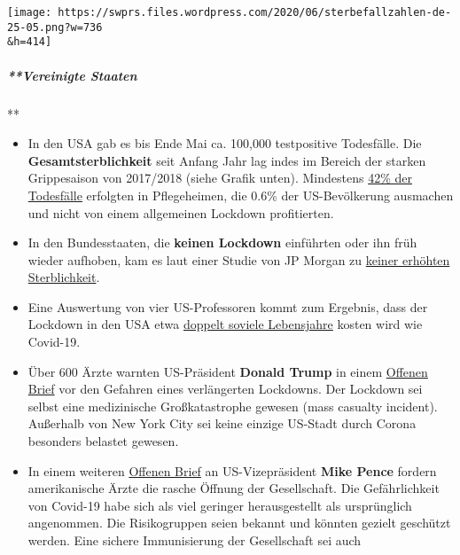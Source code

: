 \texttt{[image: https://swprs.files.wordpress.com/2020/06/sterbefallzahlen-de-25-05.png?w=736\\\&h=414]}

\hypertarget{vereinigte-staaten}{%
\subparagraph{**Vereinigte Staaten}\label{vereinigte-staaten}}

**

\begin{itemize}
\tightlist
\item
  In den USA gab es bis Ende Mai ca. 100,000 testpositive Todesfälle.
  Die \textbf{Gesamt­sterblichkeit} seit Anfang Jahr lag indes im
  Bereich der starken Grippesaison von 2017/2018 (siehe Grafik unten).
  Mindestens
  \href{https://www.forbes.com/sites/theapothecary/2020/05/26/nursing-homes-assisted-living-facilities-0-6-of-the-u-s-population-43-of-u-s-covid-19-deaths/}{42\%
  der Todesfälle} erfolgten in Pflegeheimen, die 0.6\% der
  US-Bevölkerung ausmachen und nicht von einem allgemeinen Lockdown
  profitierten.
\item
  In den Bundesstaaten, die \textbf{keinen Lockdown} einführten oder ihn
  früh wieder aufhoben, kam es laut einer Studie von JP Morgan zu
  \href{https://www.dailymail.co.uk/news/article-8347635/Lockdowns-failed-alter-course-pandemic-JP-Morgan-study-claims.html}{keiner
  erhöhten Sterblichkeit}.
\item
  Eine Auswertung von vier US-Professoren kommt zum Ergebnis, dass der
  Lockdown in den USA etwa
  \href{https://thehill.com/opinion/healthcare/499394-the-covid-19-shutdown-will-cost-americans-millions-of-years-of-life}{doppelt
  soviele Lebensjahre} kosten wird wie Covid-19.
\item
  Über 600 Ärzte warnten US-Präsident \textbf{Donald Trump} in einem
  \href{https://www.washingtonexaminer.com/news/mass-casualty-incident-over-600-doctors-sign-letter-warning-trump-of-dangers-of-continued-lockdowns}{Offenen
  Brief} vor den Gefahren eines verlängerten Lockdowns. Der Lockdown sei
  selbst eine medizinische Großkatastrophe gewesen (mass casualty
  incident). Außerhalb von New York City sei keine einzige US-Stadt
  durch Corona besonders belastet gewesen.
\item
  In einem weiteren
  \href{https://aapsonline.org/physician-letter-reopen-america/}{Offenen
  Brief} an US-Vizepräsident \textbf{Mike Pence} fordern amerikanische
  Ärzte die rasche Öffnung der Gesellschaft. Die Gefährlichkeit von
  Covid-19 habe sich als viel geringer herausgestellt als ursprünglich
  angenommen. Die Risikogruppen seien bekannt und könnten gezielt
  geschützt werden. Eine sichere Immunisierung der Gesellschaft sei auch

\end{itemize}
